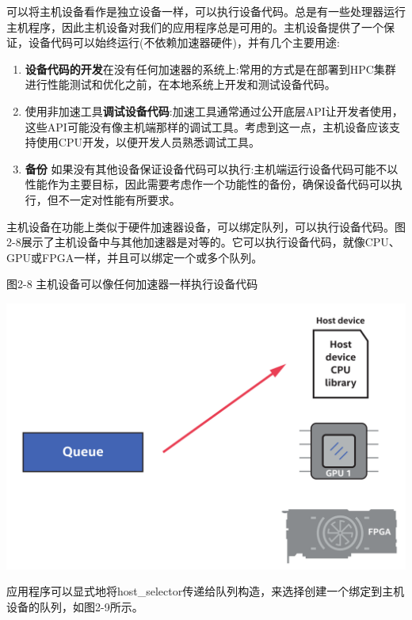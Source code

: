 可以将主机设备看作是独立设备一样，可以执行设备代码。总是有一些处理器运行主机程序，因此主机设备对我们的应用程序总是可用的。主机设备提供了一个保证，设备代码可以始终运行(不依赖加速器硬件)，并有几个主要用途:\par

\begin{enumerate}
	\item \textbf{设备代码的开发}在没有任何加速器的系统上:常用的方式是在部署到HPC集群进行性能测试和优化之前，在本地系统上开发和测试设备代码。
	\item 使用非加速工具\textbf{调试设备代码}:加速工具通常通过公开底层API让开发者使用，这些API可能没有像主机端那样的调试工具。考虑到这一点，主机设备应该支持使用CPU开发，以便开发人员熟悉调试工具。
	\item \textbf{备份} 如果没有其他设备保证设备代码可以执行:主机端运行设备代码可能不以性能作为主要目标，因此需要考虑作一个功能性的备份，确保设备代码可以执行，但不一定对性能有所要求。
\end{enumerate}

主机设备在功能上类似于硬件加速器设备，可以绑定队列，可以执行设备代码。图2-8展示了主机设备中与其他加速器是对等的。它可以执行设备代码，就像CPU、GPU或FPGA一样，并且可以绑定一个或多个队列。\par

图2-8 主机设备可以像任何加速器一样执行设备代码
\begin{center}
	\includegraphics[width=1.\textwidth]{content/chapter-2/images/6}
\end{center}

应用程序可以显式地将host\_selector传递给队列构造，来选择创建一个绑定到主机设备的队列，如图2-9所示。\par

